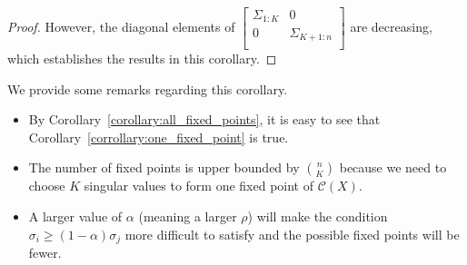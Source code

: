 \begin{proof}
However, the diagonal elements of $\left[\begin{array}{cc}
                                                                                                 \Sigma_{1:K} & 0 \\
                                                                                                 0 & \Sigma_{K+1:n} \\
                                                                                               \end{array}
                                                                                             \right]$ are decreasing, which establishes the results in this corollary.
\end{proof}

We provide some remarks regarding this corollary.
\begin{itemize}
\item By Corollary~\ref{corollary:all_fixed_points}, it is easy to see that Corollary~\ref{corrollary:one_fixed_point} is true.
\item The number of fixed points is upper bounded by $n\choose{K}$ because we need to choose $K$ singular values to form one fixed point of $\mathcal{C}(X)$.
\item A larger value of $\alpha$ (meaning a larger $\rho$) will make the condition $\sigma_{i}\geq (1-\alpha)\sigma_{j}$ more difficult to satisfy and the possible fixed points will be fewer.
\end{itemize}











